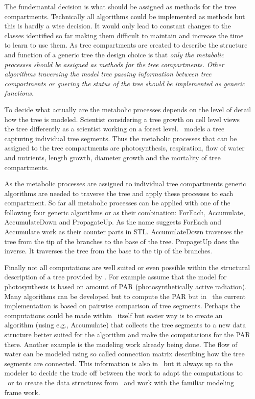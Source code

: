 The fundemantal decision is what should be assigned as methods for the
tree compartments. Technically  all algorithms could be implemented as
methods but this is  hardly a wise decision.   It  would only lead  to
constant  changes  to  the  classes   identified  so far making   them
difficult to maintain and increase the time to learn  to use them.  As
tree compartments are created  to describe the structure  and function
of a  generic tree the design  choice  is that \it  only the metabolic
processes \rm should be assigned as methods for the tree compartments.
Other algorithms traversing the model tree passing information between
tree compartments or   quering  the  status  of the  tree  should   be
implemented as generic functions.

To decide what actually  are the  metabolic  processes depends  on the
level of detail how the tree is modeled.  Scientist considering a tree
growth on cell level views the tree differently as a scientist working
on a  forest level. \lignum\ models  a tree capturing  individual tree
segments.  Thus  the metabolic processes that can  be assigned  to the
tree  compartments are photosynthesis, respiration,  flow of water and
nutrients,  length growth, diameter growth  and  the mortality of tree
compartments.

As   the  metabolic  processes   are   assigned   to   individual tree
compartments  generic algorithms are  needed to traverse  the tree and
apply these processes   to each  compartment.   So far   all metabolic
processes can  be  applied with  one  of  the following   four generic
algorithms   or   as     their   combination:   ForEach,   Accumulate,
AccumulateDown  and PropagateUp.   As the  name   suggests ForEach and
Accumulate work   as  their counter  parts   in  STL.   AccumulateDown
traverses  the tree from the  tip of the branches to   the base of the
tree. PropagetUp does the inverse. It traverses the tree from the base
to the tip of the branches.

Finally  not all computations are well  suited or even possible within
the structural description of a  tree provided by \lignum. For example
assume that  the model  for photosynthesis is  based  on amount of PAR
(photosynthetically   active  radiation).     Many   algorithms can be
developed but to compute   the   PAR  but  in \lignum\  the    current
implementation   is based on   pairwise  comparison of tree  segments.
Perhaps  the  computations could  be  made within  \lignum\ itself but
easier way  is to create  an algorithm  (using  e.g., Accumulate) that
collects the tree  segments to a  new data structure better suited for
the algorithm and  make the computations  for the PAR there.   Another
example is the modeling work already being done. The flow of water can
be modeled  using so called  connection matrix describing how the tree
segments  are connected. This information  is  also in \lignum\ but it
always up to the  modeler to decide the  trade off between the work to
adapt the  computations to \lignum\ or  to create the  data structures
from \lignum\ and work with the familiar modeling frame work.
